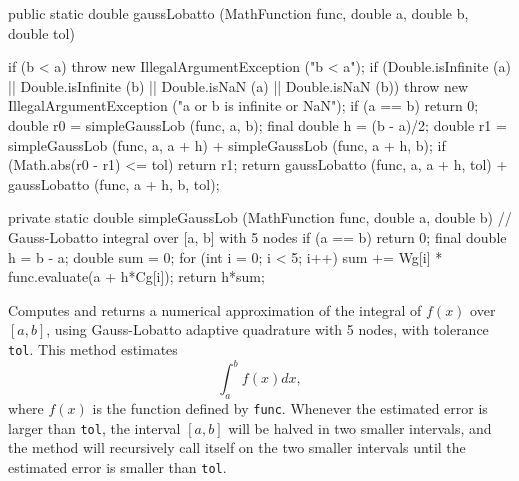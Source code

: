 \begin{code}

   public static double gaussLobatto (MathFunction func, double a, double b,
                                      double tol)\begin{hide} {
      if (b < a)
         throw new IllegalArgumentException ("b < a");
      if (Double.isInfinite (a) || Double.isInfinite (b) ||
          Double.isNaN (a) || Double.isNaN (b))
         throw new IllegalArgumentException ("a or b is infinite or NaN");
      if (a == b)
         return 0;
      double r0 = simpleGaussLob (func, a, b);
      final double h = (b - a)/2;
      double r1 = simpleGaussLob (func, a, a + h) +
                  simpleGaussLob (func, a + h, b);
      if (Math.abs(r0 - r1) <= tol)
         return r1;
      return gaussLobatto (func, a, a + h, tol) +
             gaussLobatto (func, a + h, b, tol);
   }


   private static double simpleGaussLob (MathFunction func, double a, double b) {
      // Gauss-Lobatto integral over [a, b] with 5 nodes
      if (a == b)
         return 0;
      final double h = b - a;
      double sum = 0;
      for (int i = 0; i < 5; i++) {
         sum += Wg[i] * func.evaluate(a + h*Cg[i]);
      }
      return h*sum;
   }\end{hide}
\end{code}
\begin{tabb}
 Computes and returns a numerical approximation of the integral of
  $f(x)$ over $[a, b]$, using Gauss-Lobatto adaptive quadrature with
   5 nodes, with tolerance \texttt{tol}. This method estimates
\[
\int_a^b f(x)dx,
\]
 where $f(x)$ is the function defined by \texttt{func}.
Whenever the estimated error is larger than \texttt{tol}, the interval
$[a, b]$ will be halved in two smaller intervals, and  the method will
 recursively call itself on the two smaller intervals until the estimated
 error is smaller than \texttt{tol}.
\end{tabb}
\begin{htmlonly}
\end{htmlonly}
